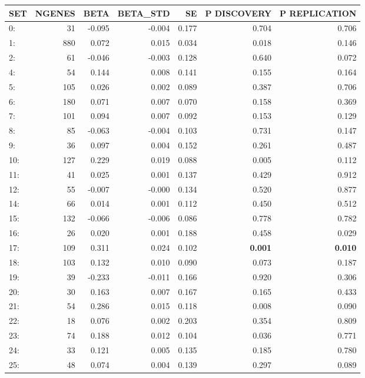 \begin{table}[ht]
\centering
\begin{tabular}{lrrrrrr}
  \hline
SET & NGENES & BETA & BETA\_STD & SE & P DISCOVERY & P REPLICATION \\ 
  \hline
0: &   31 & -0.095 & -0.004 & 0.177 & 0.704 & 0.706 \\ 
  1: &  880 & 0.072 & 0.015 & 0.034 & 0.018 & 0.146 \\ 
  2: &   61 & -0.046 & -0.003 & 0.128 & 0.640 & 0.072 \\ 
  4: &   54 & 0.144 & 0.008 & 0.141 & 0.155 & 0.164 \\ 
  5: &  105 & 0.026 & 0.002 & 0.089 & 0.387 & 0.706 \\ 
  6: &  180 & 0.071 & 0.007 & 0.070 & 0.158 & 0.369 \\ 
  7: &  101 & 0.094 & 0.007 & 0.092 & 0.153 & 0.129 \\ 
  8: &   85 & -0.063 & -0.004 & 0.103 & 0.731 & 0.147 \\ 
  9: &   36 & 0.097 & 0.004 & 0.152 & 0.261 & 0.487 \\ 
  10: &  127 & 0.229 & 0.019 & 0.088 & 0.005 & 0.112 \\ 
  11: &   41 & 0.025 & 0.001 & 0.137 & 0.429 & 0.912 \\ 
  12: &   55 & -0.007 & -0.000 & 0.134 & 0.520 & 0.877 \\ 
  14: &   66 & 0.014 & 0.001 & 0.112 & 0.450 & 0.512 \\ 
  15: &  132 & -0.066 & -0.006 & 0.086 & 0.778 & 0.782 \\ 
  16: &   26 & 0.020 & 0.001 & 0.188 & 0.458 & 0.029 \\ 
  17: &  109 & 0.311 & 0.024 & 0.102 & \textbf{0.001} & \textbf{0.010} \\ 
  18: &  103 & 0.132 & 0.010 & 0.090 & 0.073 & 0.187 \\ 
  19: &   39 & -0.233 & -0.011 & 0.166 & 0.920 & 0.306 \\ 
  20: &   30 & 0.163 & 0.007 & 0.167 & 0.165 & 0.433 \\ 
  21: &   54 & 0.286 & 0.015 & 0.118 & 0.008 & 0.090 \\ 
  22: &   18 & 0.076 & 0.002 & 0.203 & 0.354 & 0.809 \\ 
  23: &   74 & 0.188 & 0.012 & 0.104 & 0.036 & 0.771 \\ 
  24: &   33 & 0.121 & 0.005 & 0.135 & 0.185 & 0.780 \\ 
  25: &   48 & 0.074 & 0.004 & 0.139 & 0.297 & 0.089 \\ 

\end{tabular}
\end{table}
